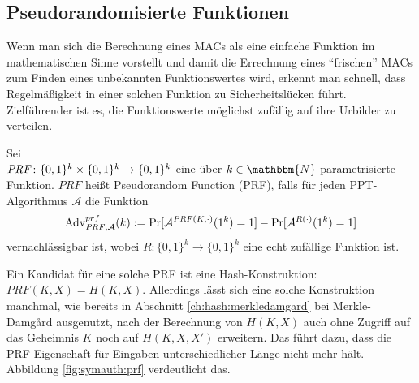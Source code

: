 \subsection{Pseudorandomisierte Funktionen}\label{ssec:prf} Wenn man
sich die Berechnung eines MACs als eine einfache Funktion im
mathematischen Sinne vorstellt und damit die Errechnung eines
"`frischen"' MACs zum Finden eines unbekannten Funktionswertes wird,
erkennt man schnell, dass Regelmäßigkeit in einer solchen Funktion zu
Sicherheitslücken führt. Zielführender ist es, die Funktionswerte
möglichst zufällig auf ihre Urbilder zu verteilen.
\begin{definition} Sei\\
  $\text{\textit{PRF}}\colon\{0,1\}^k \times \{0, 1\}^k \rightarrow
  \{0,1\}^k$ eine über $k \in \mathbbm{N}$ parametrisierte Funktion. $PRF$
  heißt Pseudorandom Function (PRF), falls für jeden PPT-Algorithmus
  $\mathcal{A}$ die Funktion
  \begin{equation*} \text{Adv}_{\text{\textit{PRF}},\mathcal{A}}^{prf}(k)
    := \Pr \lbrack \mathcal{A}^{\text{\textit{PRF}}(K,\cdot)}(1^k) = 1
    \rbrack - \Pr \lbrack \mathcal{A}^{R(\cdot)}(1^k) = 1 \rbrack
  \end{equation*} vernachlässigbar ist, wobei $R: \{0,1\}^k \rightarrow
  \{0,1\}^k$ eine echt zufällige Funktion ist.~\\
\end{definition}

Ein Kandidat für eine solche PRF ist eine Hash-Konstruktion: $PRF(K,X) =
H(K,X)$. Allerdings lässt sich eine solche Konstruktion manchmal, wie
bereits in Abschnitt \ref{ch:hash:merkledamgard} bei Merkle-Damgård
ausgenutzt, nach der Berechnung von $H(K,X)$ auch ohne Zugriff auf das
Geheimnis $K$ noch auf $H(K,X,X')$ erweitern. Das führt dazu, dass die
PRF-Eigenschaft für Eingaben unterschiedlicher Länge nicht mehr
hält. Abbildung \ref{fig:symauth:prf} verdeutlicht das.

